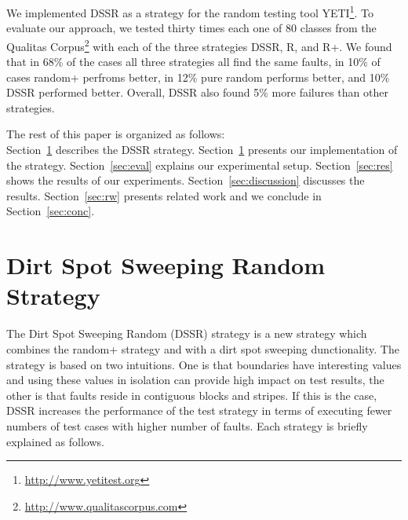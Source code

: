 \documentclass[conference]{IEEEtran}
\begin{document}
We implemented DSSR as a strategy for the random testing tool YETI\footnote{\url{http://www.yetitest.org}}. To evaluate our approach, we tested thirty times each one of 80 classes from the Qualitas Corpus\footnote{\url{http://www.qualitascorpus.com}} with each of the three strategies DSSR, R, and R+. We found that in 68\% of the cases all three strategies all find the same faults, in 10\% of cases random+ perfroms better, in 12\% pure random performs better, and 10\% DSSR performed better.
Overall, DSSR also found 5\% more failures than other strategies.

%
%
%
%
%
%
The rest of this paper is organized as follows: \\
Section~\ref{sec:dssr} describes the DSSR strategy. Section~\ref{sec:dssr} presents our implementation of the strategy. Section~\ref{sec:eval} explains our experimental setup. Section~\ref{sec:res} shows the results of our experiments. Section~\ref{sec:discussion} discusses the results. Section~\ref{sec:rw} presents related work and we conclude in Section~\ref{sec:conc}.




\section{Dirt Spot Sweeping Random Strategy}\label{sec:dssr}
The Dirt Spot Sweeping Random (DSSR) strategy is a new strategy which combines the random+ strategy and with a dirt spot sweeping dunctionality. The strategy is based on two intuitions. One is that boundaries have interesting values and using these values in isolation can provide high impact on test results, the other is that faults reside in contiguous blocks and stripes. If this is the case, DSSR increases the performance of the test strategy in terms of executing fewer numbers of test cases with higher number of faults. Each strategy is briefly explained as follows.
\end{document}
